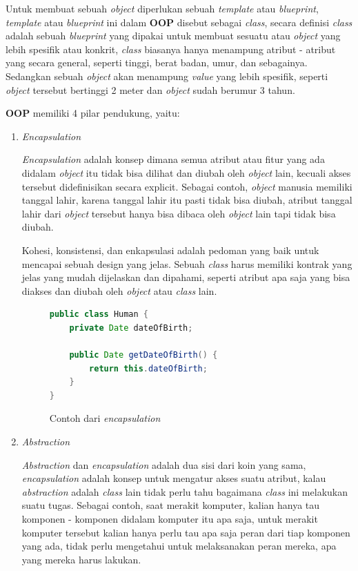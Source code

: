 \documentclass[a4paper]{article}
\begin{document}
Untuk membuat sebuah \textit{object} diperlukan sebuah \textit{template} atau \textit{blueprint}, \textit{template} atau \textit{blueprint} ini dalam \textbf{OOP} disebut sebagai \textit{class}, secara definisi \textit{class} adalah sebuah \textit{blueprint} yang dipakai untuk membuat sesuatu atau \textit{object} yang lebih spesifik atau konkrit\autocite{education-erin-oop-2020}, \textit{class} biasanya hanya menampung atribut - atribut yang secara general, seperti tinggi, berat badan, umur, dan sebagainya. Sedangkan sebuah \textit{object} akan menampung \textit{value} yang lebih spesifik, seperti \textit{object} tersebut bertinggi 2 meter dan \textit{object} sudah berumur 3 tahun.

\textbf{OOP} memiliki 4 pilar pendukung, yaitu:
\begin{enumerate}

    \item \textit{Encapsulation}

    \textit{Encapsulation} adalah konsep dimana semua atribut atau fitur yang ada didalam \textit{object} itu tidak bisa dilihat dan diubah oleh \textit{object} lain, kecuali akses tersebut didefinisikan secara explicit\autocite{education-erin-oop-2020}. Sebagai contoh, \textit{object} manusia memiliki tanggal lahir, karena tanggal lahir itu pasti tidak bisa diubah, atribut tanggal lahir dari \textit{object} tersebut hanya bisa dibaca oleh \textit{object} lain tapi tidak bisa diubah.
        
    Kohesi, konsistensi, dan enkapsulasi adalah pedoman yang baik untuk mencapai sebuah design yang jelas. Sebuah \textit{class} harus memiliki kontrak yang jelas yang mudah dijelaskan dan dipahami, seperti atribut apa saja yang bisa diakses dan diubah oleh \textit{object} atau \textit{class} lain\autocite{liang_liang_2021}.

    \begin{figure}[h]
        \centering
        \begin{lstlisting}[language=Java]
public class Human {
    private Date dateOfBirth;

    public Date getDateOfBirth() {
        return this.dateOfBirth;
    }
}\end{lstlisting}
        \caption{Contoh dari \textit{encapsulation}}
    \end{figure}

    \item \textit{Abstraction}

    \textit{Abstraction} dan \textit{encapsulation} adalah dua sisi dari koin yang sama, \textit{encapsulation} adalah konsep untuk mengatur akses suatu atribut, kalau \textit{abstraction} adalah \textit{class} lain tidak perlu tahu bagaimana \textit{class} ini melakukan suatu tugas\autocite{liang_liang_2021}. Sebagai contoh, saat merakit komputer, kalian hanya tau komponen - komponen didalam komputer itu apa saja, untuk merakit komputer tersebut kalian hanya perlu tau apa saja peran dari tiap komponen yang ada, tidak perlu mengetahui untuk melaksanakan peran mereka, apa yang mereka harus lakukan.
    \newpage
        

\end{enumerate}
\end{document}
